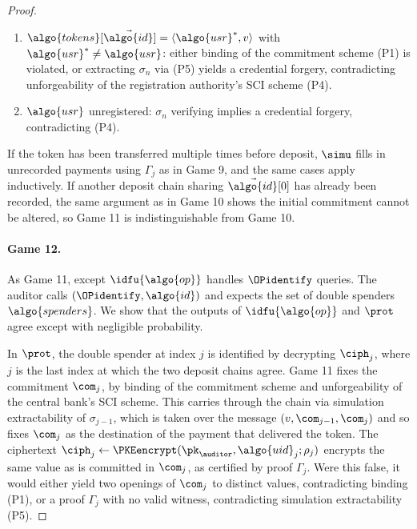 \begin{proof}
\begin{enumerate}[label=\alph*)]
  \item $\algo{tokens}[\vec{\algo{id}}] = \langle \algo{usr}^*, v \rangle$ with
$\algo{usr}^* \neq \algo{usr}$: either binding of the commitment scheme (P1) is
violated, or extracting $\sigma_n$ via (P5) yields a credential forgery,
contradicting unforgeability of the registration authority's SCI scheme (P4).

  \item $\algo{usr}$ unregistered: $\sigma_n$ verifying implies a credential
forgery, contradicting (P4).

\end{enumerate}

If the token has been transferred multiple times before deposit, $\simu$ fills
in unrecorded payments using $\Gamma_j$ as in Game 9, and the same cases apply
inductively. If another deposit chain sharing $\vec{\algo{id}}[0]$ has already been
recorded, the same argument as in Game 10 shows the initial commitment cannot be
altered, so Game 11 is indistinguishable from Game 10.

\paragraph{Game 12.} As Game 11, except $\idfu{\algo{op}}$ handles $\OPidentify$
queries. The auditor calls $(\OPidentify, \algo{id})$ and expects the set of double
spenders $\algo{spenders}$. We show that the outputs of $\idfu{\algo{op}}$ and
$\prot$ agree except with negligible probability.

In $\prot$, the double spender at index $j$ is identified by decrypting
$\ciph_j$, where $j$ is the last index at which the two deposit chains agree.
Game 11 fixes the commitment $\com_j$, by binding of the commitment scheme and
unforgeability of the central bank's SCI scheme. This carries through the chain via
simulation extractability of $\sigma_{j-1}$, which is taken over the message
$(v, \com_{j-1}, \com_j)$ and so fixes $\com_j$ as the destination of the
payment that delivered the token. The ciphertext $\ciph_j \leftarrow
\PKEencrypt(\pk_\auditor, \algo{uid}_j; \rho_j)$ encrypts the same value as is
committed in $\com_j$, as certified by proof $\Gamma_j$. Were this false, it
would either yield two openings of $\com_j$ to distinct values,
contradicting binding (P1), or a proof $\Gamma_j$ with no valid witness,
contradicting simulation extractability (P5).


\end{proof}

